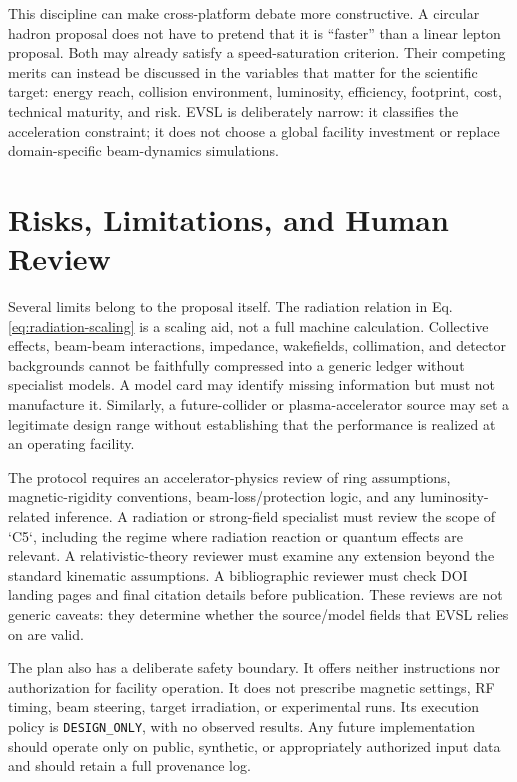 \documentclass[conference]{../../../../Conference-LaTeX-template_10-17-19/IEEEtran}
\begin{document}
This discipline can make cross-platform debate more constructive. A circular hadron proposal does not have to pretend that it is ``faster'' than a linear lepton proposal. Both may already satisfy a speed-saturation criterion. Their competing merits can instead be discussed in the variables that matter for the scientific target: energy reach, collision environment, luminosity, efficiency, footprint, cost, technical maturity, and risk. EVSL is deliberately narrow: it classifies the acceleration constraint; it does not choose a global facility investment or replace domain-specific beam-dynamics simulations.

\section{Risks, Limitations, and Human Review}
Several limits belong to the proposal itself. The radiation relation in Eq. \eqref{eq:radiation-scaling} is a scaling aid, not a full machine calculation. Collective effects, beam-beam interactions, impedance, wakefields, collimation, and detector backgrounds cannot be faithfully compressed into a generic ledger without specialist models. A model card may identify missing information but must not manufacture it. Similarly, a future-collider or plasma-accelerator source may set a legitimate design range without establishing that the performance is realized at an operating facility.

The protocol requires an accelerator-physics review of ring assumptions, magnetic-rigidity conventions, beam-loss/protection logic, and any luminosity-related inference. A radiation or strong-field specialist must review the scope of `C5`, including the regime where radiation reaction or quantum effects are relevant. A relativistic-theory reviewer must examine any extension beyond the standard kinematic assumptions. A bibliographic reviewer must check DOI landing pages and final citation details before publication. These reviews are not generic caveats: they determine whether the source/model fields that EVSL relies on are valid.

The plan also has a deliberate safety boundary. It offers neither instructions nor authorization for facility operation. It does not prescribe magnetic settings, RF timing, beam steering, target irradiation, or experimental runs. Its execution policy is \texttt{DESIGN\_ONLY}, with no observed results. Any future implementation should operate only on public, synthetic, or appropriately authorized input data and should retain a full provenance log.
\end{document}
